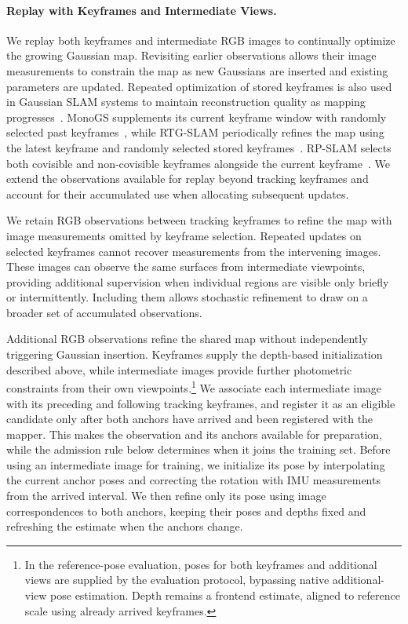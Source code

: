 \paragraph{Replay with Keyframes and Intermediate Views.}
We replay both keyframes and intermediate RGB images to continually optimize the growing Gaussian map.
Revisiting earlier observations allows their image measurements to constrain the map as new Gaussians are inserted and existing parameters are updated.
Repeated optimization of stored keyframes is also used in Gaussian SLAM systems to maintain reconstruction quality as mapping progresses~\cite{huang2024photoslam,rtgslam2024,matsuki2024monogs,cartgs}.
MonoGS supplements its current keyframe window with randomly selected past keyframes~\cite{matsuki2024monogs}, while RTG-SLAM periodically refines the map using the latest keyframe and randomly selected stored keyframes~\cite{rtgslam2024}.
RP-SLAM selects both covisible and non-covisible keyframes alongside the current keyframe~\cite{bai2024rpslam}.
We extend the observations available for replay beyond tracking keyframes and account for their accumulated use when allocating subsequent updates.

We retain RGB observations between tracking keyframes to refine the map with image measurements omitted by keyframe selection.
Repeated updates on selected keyframes cannot recover measurements from the intervening images.
These images can observe the same surfaces from intermediate viewpoints, providing additional supervision when individual regions are visible only briefly or intermittently.
Including them allows stochastic refinement to draw on a broader set of accumulated observations.

Additional RGB observations refine the shared map without independently triggering Gaussian insertion.
Keyframes supply the depth-based initialization described above, while intermediate images provide further photometric constraints from their own viewpoints.\footnote{In the reference-pose evaluation, poses for both keyframes and additional views are supplied by the evaluation protocol, bypassing native additional-view pose estimation. Depth remains a frontend estimate, aligned to reference scale using already arrived keyframes.}
We associate each intermediate image with its preceding and following tracking keyframes, and register it as an eligible candidate only after both anchors have arrived and been registered with the mapper.
This makes the observation and its anchors available for preparation, while the admission rule below determines when it joins the training set.
Before using an intermediate image for training, we initialize its pose by interpolating the current anchor poses and correcting the rotation with IMU measurements from the arrived interval.
We then refine only its pose using image correspondences to both anchors, keeping their poses and depths fixed and refreshing the estimate when the anchors change.

